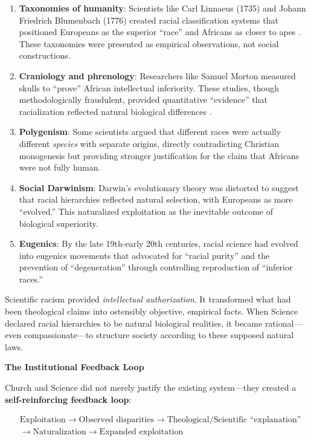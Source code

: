 \documentclass[12pt,openany]{book}
\begin{document}
\begin{enumerate}
    \item \textbf{Taxonomies of humanity}: Scientists like Carl Linnaeus (1735) and Johann Friedrich Blumenbach (1776) created racial classification systems that positioned Europeans as the superior ``race'' and Africans as closer to apes \cite{gould}. These taxonomies were presented as empirical observations, not social constructions.
    
    \item \textbf{Craniology and phrenology}: Researchers like Samuel Morton measured skulls to ``prove'' African intellectual inferiority. These studies, though methodologically fraudulent, provided quantitative ``evidence'' that racialization reflected natural biological differences \cite{gould}.
    
    \item \textbf{Polygenism}: Some scientists argued that different races were actually different \textit{species} with separate origins, directly contradicting Christian mono\-genesis but providing stronger justification for the claim that Africans were not fully human.
    
    \item \textbf{Social Darwinism}: Darwin's evolutionary theory was distorted to suggest that racial hierarchies reflected natural selection, with Europeans as more ``evolved.'' This naturalized exploitation as the inevitable outcome of biological superiority.
    
    \item \textbf{Eugenics}: By the late 19th-early 20th centuries, racial science had evolved into eugenics movements that advocated for ``racial purity'' and the prevention of ``degeneration'' through controlling reproduction of ``inferior races.''
\end{enumerate}

Scientific racism provided \textit{intellectual authorization}. It transformed what had been theological claims into ostensibly objective, empirical facts. When Science declared racial hierarchies to be natural biological realities, it became rational---even compassionate---to structure society according to these supposed natural laws.

\textbf{The Institutional Feedback Loop}

Church and Science did not merely justify the existing system---they created a \textbf{self-reinforcing feedback loop}:

\[
\begin{aligned}
&\text{Exploitation} \rightarrow \text{Observed disparities} \rightarrow \text{Theological/Scientific ``explanation''} \\
&\rightarrow \text{Naturalization} \rightarrow \text{Expanded exploitation}
\end{aligned}
\]
\end{document}
